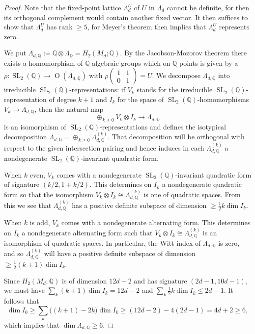 \documentclass[10pt,letterpaper]{amsart}
\numberwithin{equation}{section}
\def\QQ{{\mathbb Q}}
\newcommand\SL{\operatorname{SL}}
\newcommand\Orth{\operatorname{O}}
\theoremstyle{remark}
\begin{document}
\begin{proof}
Note that the fixed-point lattice  $\Lambda_d^U$ of $U$ in $\Lambda_d$ cannot be definite,  for then its orthogonal complement would contain another fixed vector.    
It then suffices to show that $\Lambda_d^U$ has rank $\ge 5$, for Meyer's theorem then implies that $\Lambda_d^U$ represents zero. 

We put $\Lambda_{d, \QQ}:=\QQ\otimes\Lambda_\QQ=H_2(M_d;\QQ)$. 
By the Jacobson-Mozorov theorem  there exists a homomorphism of $\QQ$-algebraic groups which on $\QQ$-points is given  by a $\rho: \SL_2(\QQ)\to \Orth(\Lambda_{d, \QQ})$ with 
$\rho(\begin{smallmatrix}
1 & 1\\
0 & 1
\end{smallmatrix})=U$.
We decompose $\Lambda_{d, \QQ}$ into irreducible  $\SL_2(\QQ)$-representations:
if $V_k$ stands for  the irreducible $\SL_2(\QQ)$-representation  of degree $k+1$  and $I_k$ for the space of $\SL_2(\QQ)$-homomorphisms $V_k\to \Lambda_{d, \QQ}$, then the natural map
\[
\oplus_{k\ge 0} V_k\otimes I_k\to  \Lambda_{d, \QQ}
\]
is an isomorphism of  $\SL_2(\QQ)$-representations and defines the isotypical decomposition 
$\Lambda_{d, \QQ}=\oplus_{k\ge 0} \Lambda_{d, \QQ}^{(k)}$. That decomposition  will be orthogonal with respect to the given intersection pairing  and hence induces in each $\Lambda_{d, \QQ}^{(k)}$ a nondegenerate $\SL_2(\QQ)$-invariant quadratic form. 

When  $k$ even,  $V_k$ comes with a nondegenerate $\SL_2(\QQ)$-invariant quadratic  form  of signature $(k/2, 1+k/2)$. This determines on $I_k$  a nondegenerate quadratic form
so that the isomorphism $ V_k\otimes I_k\cong \Lambda_{d, \QQ}^{(k)}$ is one of quadratic spaces.
From this  we see that $\Lambda_{d, \QQ}^{(k)}$  has a positive definite subspace of dimension $\ge  \frac{1}{2}k\dim I_k$. 

When $k$ is odd,  $V_k$ comes with a nondegenerate alternating  form.  This determines on $I_k$ a nondegenerate alternating  form such that $ V_k\otimes I_k\cong \Lambda_{d, \QQ}^{(k)}$ is an isomorphism  of quadratic spaces. In particular, the Witt index of  $\Lambda_{d, \QQ}$ is zero, and so  $\Lambda_{d, \QQ}^{(k)}$ will have  a positive definite subspace of dimension $\ge \frac{1}{2}(k+1)\dim I_k$. 

Since  $H_2(M_d;\QQ)$ is of dimension $12 d-2$ and has signature $(2d-1, 10d-1)$, we must have $\sum_k  (k+1)\dim I_k=12 d-2$ and 
$\sum_k \frac{1}{2}k \dim I_k\le 2d-1$. It follows that 
\[
\textstyle \dim I_0\ge \sum_k \big((k+1)-2k\big)\dim I_k\ge (12 d-2)-4(2d-1)=4d+2\ge 6,
\]
which implies that $\dim \Lambda_{d, \QQ}\ge 6$.
\end{proof}
\end{document}
